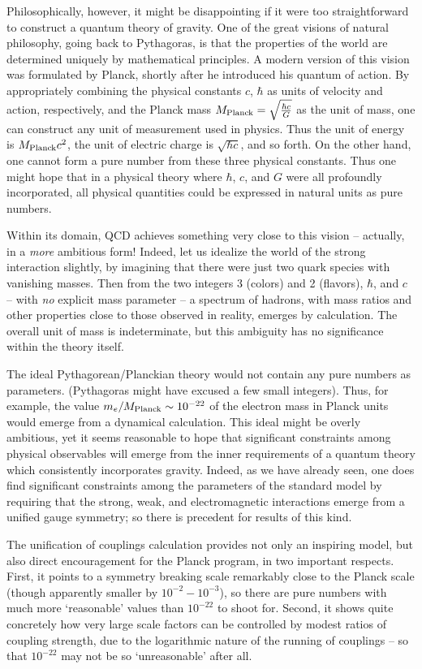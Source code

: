 \documentclass[12pt]{article}
\begin{document}
Philosophically, however, it
might be disappointing if it were too straightforward to construct a
quantum theory of gravity.  One of the great visions of natural
philosophy, going back to Pythagoras, is that the properties of the
world are determined uniquely by mathematical principles.  A modern
version of this vision was formulated by Planck, shortly after he
introduced his quantum of action.  By appropriately combining the
physical constants $c$, $\hbar$ as units of velocity and action,
respectively, and the Planck mass $M_{\rm Planck} = \sqrt {\hbar c
\over G}$ as the unit of mass, one can construct any unit of
measurement used in physics.   
Thus the unit of energy is $M_{\rm Planck} c^2$, the unit of electric
charge is $\sqrt {\hbar c}$, and so forth.  On the other hand, one
cannot form a pure number from these three physical constants.  Thus
one might hope that in a physical theory where $\hbar$, $c$, and $G$
were all profoundly incorporated, all physical quantities could be
expressed in natural units as pure numbers.

Within its domain, QCD achieves  something very close to
this vision --  actually, in a {\it more\/} ambitious form!   Indeed,
let us idealize the world of the strong interaction slightly, by
imagining that there were just two quark species with vanishing
masses.   Then from the two integers 3 (colors) and 2 (flavors),
$\hbar$, and $c$ -- with {\it no\/} explicit mass parameter -- a
spectrum of hadrons, with mass ratios and other properties close
to those observed in reality, emerges by calculation.   
The overall unit of mass is indeterminate, but this ambiguity has no
significance within the theory itself.  

The ideal
Pythagorean/Planckian theory would not contain any pure numbers as
parameters.  (Pythagoras might have excused a few small integers).
Thus, for example, the value $m_e/M_{\rm Planck} \sim 10^{-22}$ of the
electron mass in Planck units would emerge from a dynamical
calculation.
This ideal might be overly ambitious, yet it seems reasonable to
hope that significant constraints among physical observables will
emerge from the inner requirements of a quantum theory which
consistently incorporates gravity.  Indeed, as we have already seen, one does
find significant constraints among the parameters of the standard
model by requiring that the strong, weak, and electromagnetic
interactions emerge from a unified gauge symmetry; so there is
precedent for results of this kind.

The unification of couplings calculation provides not only an
inspiring model, 
but also direct
encouragement for the Planck program, in two important respects.  First,
it points to a symmetry breaking scale remarkably close to the Planck
scale (though apparently smaller by $10^{-2}-10^{-3}$), so there are
pure numbers with much more `reasonable' values than $10^{-22}$ to
shoot for.  Second, it shows quite concretely how very large scale
factors can be controlled by modest ratios of coupling strength, due
to the logarithmic nature of the running of couplings -- so that
$10^{-22}$ may not be so `unreasonable' after all.  
\end{document}
